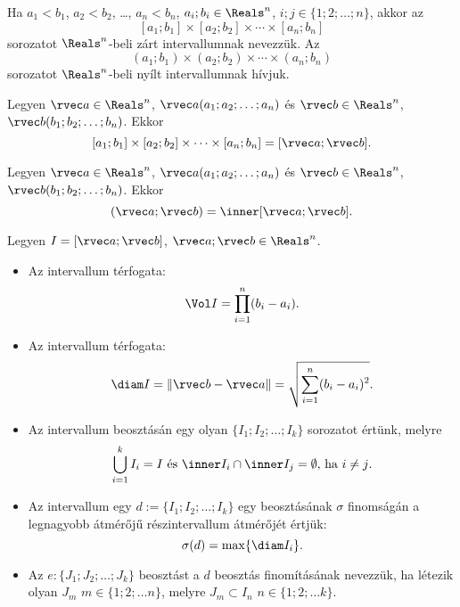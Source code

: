 \begin{definition}
  Ha $a_1 < b_1$, $a_2 < b_2$, \ldots, $a_n < b_n$, $a_i; b_i \in \Reals^n$,
  $i;j \in \{1;2;\ldots;n\}$, akkor az
  $$
    [a_1; b_1] \times [a_2; b_2] \times \cdots \times [a_n; b_n]
  $$
  sorozatot $\Reals^n$-beli zárt intervallumnak nevezzük. Az
  $$
    (a_1; b_1) \times (a_2; b_2) \times \cdots \times (a_n; b_n)
  $$
  sorozatot $\Reals^n$-beli nyílt intervallumnak hívjuk.
\end{definition}

\begin{note}
  Legyen $\rvec a \in \Reals^n$, $\rvec a(a_1; a_2; \ldots; a_n)$ és
  $\rvec b \in \Reals^n$, $\rvec b(b_1; b_2; \ldots; b_n)$. Ekkor
  $$
    [a_1; b_1] \times [a_2; b_2] \times \cdots \times [a_n; b_n] = [\rvec a; \rvec b]
    \text.
  $$
\end{note}

\begin{note}
  Legyen $\rvec a \in \Reals^n$, $\rvec a(a_1; a_2; \ldots; a_n)$ és
  $\rvec b \in \Reals^n$, $\rvec b(b_1; b_2; \ldots; b_n)$. Ekkor
  $$
    (\rvec a; \rvec b) = \inner [\rvec a; \rvec b]
    \text.
  $$
\end{note}

\begin{definition}
  Legyen $I = [\rvec a; \rvec b]$, $\rvec a; \rvec b \in \Reals^n$.
  \begin{itemize}
    \item Az intervallum térfogata:
          $$
            \Vol I = \prod_{i = 1}^n (b_i - a_i)
            \text.
          $$

    \item Az intervallum térfogata:
          $$
            \diam I
            = \|\rvec b - \rvec a\|
            = \sqrt{\displaystyle\sum_{i = 1}^n(b_i - a_i)^2}
            \text.
          $$

    \item Az intervallum beosztásán egy olyan $\{ I_1; I_2; \dots; I_k\}$
          sorozatot értünk, melyre
          $$
            \bigcup_{i = 1}^k I_i = I
            \text{ és }
            \inner I_i \cap \inner I_j = \emptyset
            \text{, ha } i \neq j
            \text.
          $$

    \item Az intervallum egy $d := \{I_1; I_2; \ldots; I_k\}$ egy beosztásának
          $\sigma$ finomságán a legnagyobb átmérőjű részintervallum átmérőjét
          értjük:
          $$
            \sigma(d) = \max \{ \diam I_i \}
            \text.
          $$

    \item Az $e: \{J_1; J_2; \ldots; J_k\}$ beosztást a $d$ beosztás
          finomításának nevezzük, ha létezik olyan $J_m$
          $m \in \{ 1; 2; \ldots n \}$, melyre  $J_m \subset I_n$
          $n \in \{ 1; 2; \ldots k \}$.
  \end{itemize}
\end{definition}

